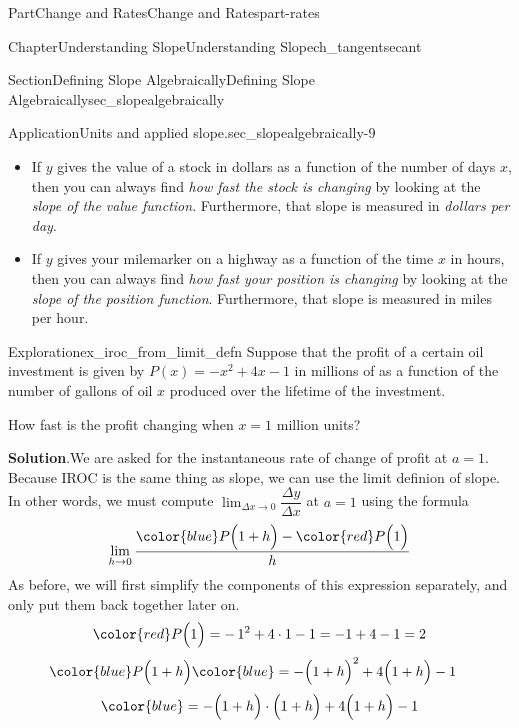 \documentclass{tufte-book}
\newcommand{\blocktitlefont}{\relax}
\numberwithin{equation}{chapter}
\newcommand{\amp}{&}
\begin{document}
\begin{partptx}{Part}{Change and Rates}{}{Change and Rates}{}{}{part-rates}
\begin{chapterptx}{Chapter}{Understanding Slope}{}{Understanding Slope}{}{}{ch_tangentsecant}
\begin{sectionptx}{Section}{Defining Slope Algebraically}{}{Defining Slope Algebraically}{}{}{sec_slopealgebraically}
\begin{insight}{Application}{Units and applied slope.}{sec_slopealgebraically-9}
%
\begin{itemize}[label=\textbullet]
\item{}If \(y\) gives the value of a stock in dollars as a function of the number of days \(x\), then you can always find \emph{how fast the stock is changing} by looking at the \emph{slope of the value function}. Furthermore, that slope is measured in \emph{dollars per day}.%
\item{}If \(y\) gives your milemarker on a highway as a function of the time \(x\) in hours, then you can always find \emph{how fast your position is changing} by looking at the \emph{slope of the position function}. Furthermore, that slope is measured in miles per hour.%
\end{itemize}
%
\end{insight}
\begin{exploration}{Exploration}{}{ex_iroc_from_limit_defn}%
Suppose that the profit of a certain oil investment is given by \(P(x) = -x^2 + 4x - 1\) in millions of \textdollar{} as a function of the number of gallons of oil \(x\) produced over the lifetime of the investment.%
\par
How fast is the profit changing when \(x=1\) million units?%
\par\smallskip%
\noindent\textbf{\blocktitlefont Solution}.\hypertarget{ex_iroc_from_limit_defn-2}{}\quad{}We are asked for the instantaneous rate of change of profit at \(a=1\). Because IROC is the same thing as slope, we can use the limit definion of slope.  In other words, we must compute \(\lim_{\Delta x\rightarrow 0}\dfrac{\Delta y}{\Delta x}\) at \(a=1\) using the formula%
\begin{equation*}
\lim_{h\rightarrow 0} \dfrac{ {\color{blue} P\Big(1 + h\Big)}- {\color{red} P\Big(1\Big)} }{h}
\end{equation*}
As before, we will first simplify the components of this expression separately, and only put them back together later on.%
\begin{equation*}
\color{red} P\Big(1\Big) = -\,1^2 + 4\cdot 1 - 1 = -1 + 4 -1 = 2
\end{equation*}
%
\begin{align*}
\color{blue} P\Big(1 + h\Big) \amp\color{blue} = -\Big(1 + h\Big)^2 + 4\Big(1 + h\Big) - 1
\end{align*}
%
\begin{gather*}
\color{blue} = -\Big(1 + h\Big)\cdot \Big(1 + h\Big) + 4\Big(1 + h\Big) - 1
\end{gather*}
%
\begin{gather*}

\end{gather*}
\end{exploration}
\end{sectionptx}
\end{chapterptx}
\end{partptx}
\end{document}
